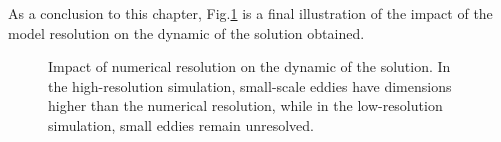 As a conclusion to this chapter, Fig.\ref{C2 - FIG - Subfilter quantities illustration} is a final illustration of the impact of the model resolution on the dynamic of the solution obtained.

\begin{figure}[!h]
    \centering
        
    \caption{Impact of numerical resolution on the dynamic of the solution. In the high-resolution simulation, small-scale eddies have dimensions higher than the numerical resolution, while in the low-resolution simulation, small eddies remain unresolved.}
    \label{C2 - FIG - Subfilter quantities illustration}
\end{figure}


